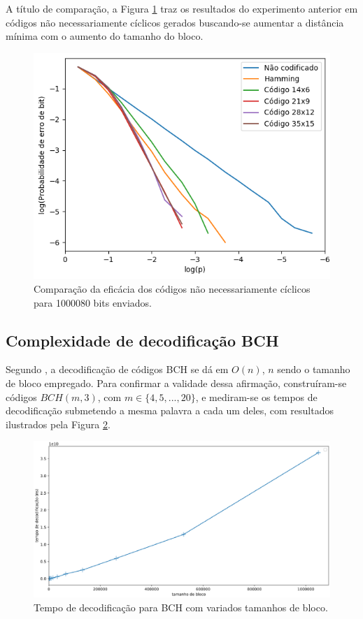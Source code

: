 A título de comparação, a Figura \ref{fig:non_cyclic_comparison} traz os resultados do experimento anterior em códigos não necessariamente cíclicos gerados buscando-se aumentar a distância mínima com o aumento do tamanho do bloco.

\begin{figure}[!hb]
	\centering
	\captionsetup{justification=centering}
	\includegraphics[scale=0.45]{floats/non_cyclic.png}
	\caption{\label{fig:non_cyclic_comparison}Comparação da eficácia dos códigos não necessariamente cíclicos para 1000080 bits enviados.}
\end{figure}


\subsection{\label{complexidade_decod}Complexidade de decodificação BCH}

Segundo \cite{ref:algoritmo-berlekamp}, a decodificação de códigos BCH se dá em $O(n)$, $n$ sendo o tamanho de bloco empregado. Para confirmar a validade dessa afirmação, construíram-se códigos $BCH(m, 3)$, com $m \in \lbrace 4,5,...,20 \rbrace$, e mediram-se os tempos de decodificação submetendo a mesma palavra a cada um deles, com resultados ilustrados pela Figura \ref{fig:bch_decoding_is_linear}.

\begin{figure}[!hb]
	\centering
    \captionsetup{justification=centering}
	\includegraphics[scale=0.3]{floats/bch-decode-is-linear.eps}
	\caption{\label{fig:bch_decoding_is_linear}Tempo de decodificação para BCH com variados tamanhos de bloco.}
\end{figure}

